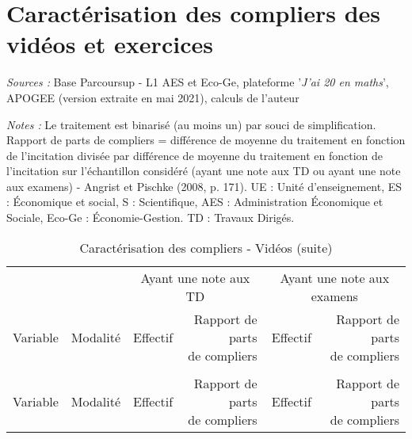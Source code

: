 \documentclass[
]{book}
\begin{document}
\newpage  
\setcounter{table}{0}
\setcounter{figure}{0}

\hypertarget{g20compliers}{%
\section{Caractérisation des compliers des vidéos et exercices}\label{g20compliers}}

\begingroup\fontsize{8}{10}\selectfont

\begin{ThreePartTable}
\begin{TableNotes}
\item \textit{Sources :} Base Parcoursup - L1 AES et Eco-Ge, plateforme '\textit{J'ai 20 en maths}', APOGEE (version extraite en mai 2021), calculs de l'auteur
\item \textit{Notes :} Le traitement est binarisé (au moins un) par souci de simplification. Rapport de parts de compliers = différence de moyenne du traitement en fonction de l'incitation divisée par différence de moyenne du traitement en fonction de l'incitation sur l'échantillon considéré (ayant une note aux TD ou ayant une note aux examens) - Angrist et Pischke (2008, p. 171). UE : Unité d'enseignement, ES : Économique et social, S : Scientifique, AES : Administration Économique et Sociale, Eco-Ge : Économie-Gestion. TD : Travaux Dirigés.
\end{TableNotes}
\begin{longtable}[t]{llrrrr}
\caption{\label{tab:g20compliersvideosviewstot}Caractérisation des compliers - Vidéos}\\
\toprule
\multicolumn{2}{c}{ } & \multicolumn{2}{c}{Ayant une note aux TD} & \multicolumn{2}{c}{Ayant une note aux examens} \\
\cmidrule(l{3pt}r{3pt}){3-4} \cmidrule(l{3pt}r{3pt}){5-6}
Variable & Modalité & Effectif & \makecell{Rapport de parts \\ de compliers} & Effectif & \makecell{Rapport de parts \\ de compliers}\\
\midrule
\endfirsthead
\caption[]{\label{tab:g20compliersvideosviewstot}Caractérisation des compliers - Vidéos (suite)}\\
\toprule
Variable & Modalité & Effectif & \makecell{Rapport de parts \\ de compliers} & Effectif & \makecell{Rapport de parts \\ de compliers}\\
\midrule
\endhead


\end{longtable}
\end{ThreePartTable}
\end{document}
